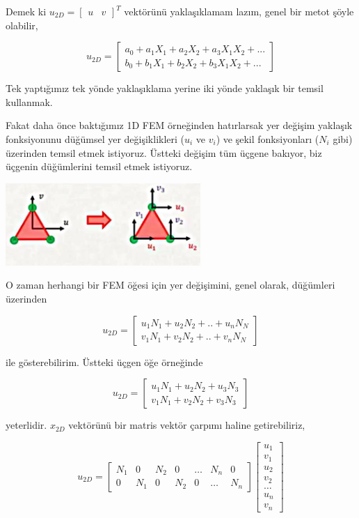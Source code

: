 \documentclass[12pt,fleqn]{article}\usepackage{../../common}
\begin{document}
Demek ki $u_{2D} = [\begin{array}{cc} u & v \end{array}]^T$ vektörünü
yaklaşıklamam lazım, genel bir metot şöyle olabilir,

$$
u_{2D} = \left[\begin{array}{c}
a_0 + a_1 X_1 + a_2 X_2 + a_3 X_1 X_2 + ...\\
b_0 + b_1 X_1 + b_2 X_2 + b_3 X_1 X_2 + ...
\end{array}\right]
$$

Tek yaptığımız tek yönde yaklaşıklama yerine iki yönde yaklaşık bir temsil
kullanmak. 

Fakat daha önce baktığımız 1D FEM örneğinden hatırlarsak yer değişim yaklaşık
fonksiyonunu düğümsel yer değişiklikleri ($u_i$ ve $v_i$) ve şekil fonksiyonları
($N_i$ gibi) üzerinden temsil etmek istiyoruz. Üstteki değişim tüm üçgene
bakıyor, biz üçgenin düğümlerini temsil etmek istiyoruz. 

\includegraphics[width=20em]{compscieng_bpp45fem3_04.jpg}

O zaman herhangi bir FEM öğesi için yer değişimini, genel olarak, düğümleri
üzerinden

$$
u_{2D} = \left[\begin{array}{c}
u_1 N_1 + u_2 N_2 + .. + u_n N_N \\
v_1 N_1 + v_2 N_2 + .. + v_n N_N
\end{array}\right]
$$

ile gösterebilirim. Üstteki üçgen öğe örneğinde 

$$
u_{2D} = \left[\begin{array}{c}
u_1 N_1 + u_2 N_2 + u_3 N_3 \\
v_1 N_1 + v_2 N_2 + v_3 N_3
\end{array}\right]
$$

yeterlidir. $x_{2D}$ vektörünü bir matris vektör çarpımı haline getirebiliriz,

$$
u_{2D} = \left[\begin{array}{ccccccc}
N_1 & 0 & N_2 & 0 & \dots & N_n & 0 \\
0 & N_1 & 0 & N_2 & 0 & \dots & N_n 
\end{array}\right]
\left[\begin{array}{c}
u_1 \\ v_1 \\ u_2 \\ v_2 \\ \dots \\ u_n \\ v_n
\end{array}\right]
$$
\end{document}
